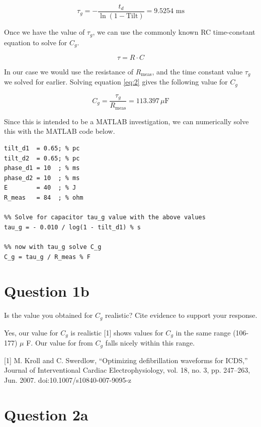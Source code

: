 \documentclass[]{report}
\begin{document}
\[
	\tau_g = - \frac{t_d}{\ln{\left( 1 - \text{Tilt} \right)}} = 9.5254 \text{ ms}	
\]

Once we have the value of $\tau_g$, we can use the commonly known RC time-constant equation to solve for $C_g$.

\begin{equation}
\label{eq:2}
	\tau = R \cdot C
\end{equation}

In our case we would use the resistance of $R_\text{meas}$, and the time constant value $\tau_g$ we solved for earlier. Solving equation \ref{eq:2} gives the following value for $C_g$

\[
	C_g = \frac{\tau_g}{R_\text{meas}} = 113.397 \,\mu\text{F}
\]

Since this is intended to be a MATLAB investigation, we can numerically solve this with the MATLAB code below.

\begin{lstlisting}[style=Matlab-editor, backgroundcolor=\color{smoky}]
%% use params from fixed tilt waveform (defib unsuccessful)
tilt_d1  = 0.65; % pc
tilt_d2  = 0.65; % pc
phase_d1 = 10  ; % ms
phase_d2 = 10  ; % ms
E        = 40  ; % J
R_meas   = 84  ; % ohm

%% Solve for capacitor tau_g value with the above values
tau_g = - 0.010 / log(1 - tilt_d1) % s

%% now with tau_g solve C_g
C_g = tau_g / R_meas % F
\end{lstlisting}

\section*{Question 1b}

Is the value you obtained for $C_g$ realistic? Cite evidence to support your response. 

Yes, our value for $C_g$ is realistic [1] shows values for $C_g$ in the same range (106-177) $\mu$ F. Our value for  from $C_g$ falls nicely within this range.

[1] M. Kroll and C. Swerdlow, “Optimizing defibrillation waveforms for ICDS,” Journal of Interventional Cardiac Electrophysiology, vol. 18, no. 3, pp. 247–263, Jun. 2007. doi:10.1007/s10840-007-9095-z 

\section*{Question 2a}
\end{document}
